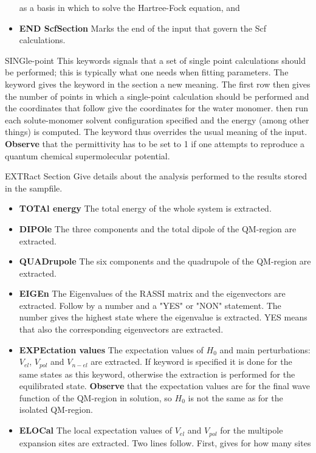 \begin{keywordlist}
\begin{itemize}
as a basis in which to solve the Hartree-Fock equation, and
\item {\bf END ScfSection}
Marks the end of the input that govern the Scf calculations.
\end{itemize}
\item[SINGle-point]
This keywords signals that a set of single point calculations
should be performed; this is typically what one needs when
fitting parameters. The keyword gives the 
keyword in the  section a new meaning. The first
row then gives the number of points in which a single-point calculation
should be performed and the coordinates that follow give the
coordinates for the water monomer.  then run each
solute-monomer solvent configuration specified and the energy (among
other things) is computed. The keyword
thus overrides
the usual meaning of the input. {\bf Observe} that the permittivity
has to be set to 1 if one attempts to reproduce a quantum chemical
supermolecular potential.
\item[EXTRact Section]
Give details about the analysis performed to the results stored in the
sampfile.
\begin{itemize}
\item {\bf TOTAl energy}
The total energy of the whole system is extracted.
\item {\bf DIPOle}
The three components and the total dipole of the QM-region are extracted.
\item {\bf QUADrupole}
The six components and the quadrupole of the QM-region are extracted.
\item {\bf EIGEn}
The Eigenvalues of the RASSI matrix and the eigenvectors are extracted.
Follow by a number and a "YES" or "NON" statement. The number gives the
highest state where the eigenvalue is extracted. YES means that also the
corresponding eigenvectors are extracted.
\item {\bf EXPEctation values}
The expectation values of $H_0$ and main perturbations: $V_{el}$, $V_{pol}$ and
$V_{n-el}$ are extracted. If keyword  is specified it is done
for the same states as this keyword, otherwise the extraction is performed for
the equilibrated state. {\bf Observe} that the expectation values are for the
final wave function of the QM-region in solution, so $H_0$ is not the same as
for the isolated QM-region.
\item {\bf ELOCal}
The local expectation values of $V_{el}$ and $V_{pol}$ for the multipole
expansion sites are extracted. Two lines follow. First, gives for how many sites

\end{itemize}
\end{keywordlist}

